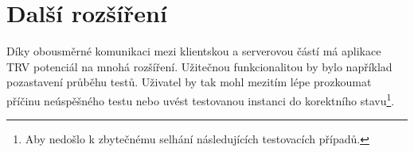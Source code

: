   \section{Další rozšíření}
  Díky obousměrné komunikaci mezi klientskou a serverovou částí má aplikace TRV potenciál na mnohá rozšíření. Užitečnou funkcionalitou by bylo například pozastavení průběhu testů. Uživatel by tak mohl mezitím lépe prozkoumat příčinu neúspěšného testu nebo uvést testovanou instanci do korektního stavu\footnote{Aby nedošlo k zbytečnému selhání následujících testovacích případů.}. 
  
